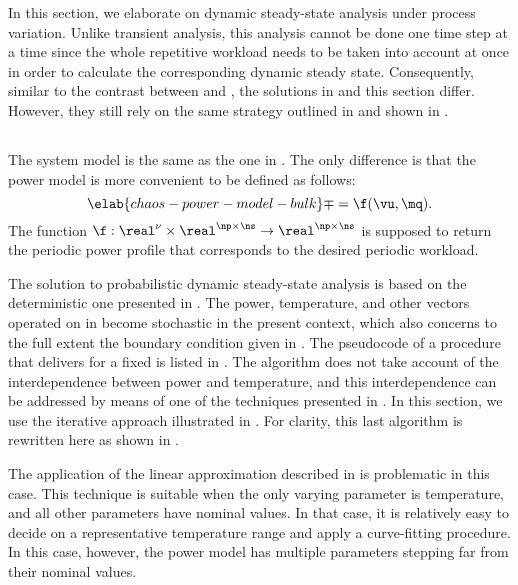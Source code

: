 In this section, we elaborate on dynamic steady-state analysis under process
variation. Unlike transient analysis, this analysis cannot be done one time step
at a time since the whole repetitive workload needs to be taken into account at
once in order to calculate the corresponding dynamic steady state. Consequently,
similar to the contrast between  and
, the solutions in
 and this section differ. However, they still
rely on the same strategy outlined in  and
shown in .

\subsection{\problemtitle}

The system model is the same as the one in . The
only difference is that the power model is more convenient to be defined as
follows:
\begin{equation} \elab{chaos-power-model-bulk}
  \mp = \f(\vu, \mq).
\end{equation}
The function $\f: \real^\nu \times \real^{\np \times \ns} \to \real^{\np \times
\ns}$ is supposed to return the periodic power profile that corresponds to the
desired periodic workload.

The solution to probabilistic dynamic steady-state analysis is based on the
deterministic one presented in . The power,
temperature, and other vectors operated on in
 become stochastic in the present context,
which also concerns to the full extent the boundary condition given in
. The pseudocode of a procedure that
delivers \mq for a fixed \vu is listed in . The
algorithm does not take account of the interdependence between power and
temperature, and this interdependence can be addressed by means of one of the
techniques presented in . In this section, we
use the iterative approach illustrated in
. For clarity, this last algorithm is
rewritten here as shown in .

\begin{remark}
The application of the linear approximation described in
 is problematic in this case. This technique
is suitable when the only varying parameter is temperature, and all other
parameters have nominal values. In that case, it is relatively easy to decide on
a representative temperature range and apply a curve-fitting procedure. In this
case, however, the power model has multiple parameters stepping far from their
nominal values.
\end{remark}

